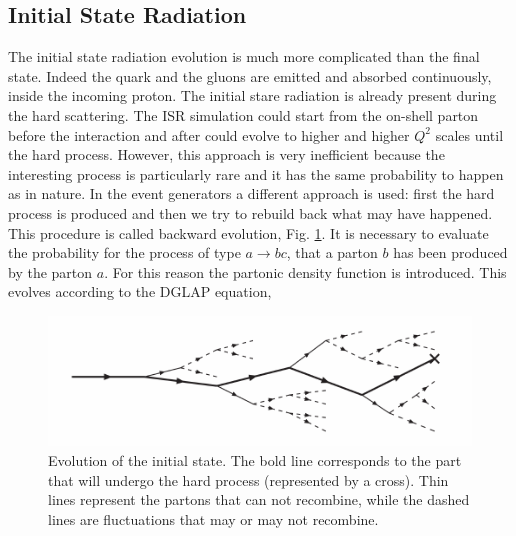 \subsection*{Initial State Radiation}
The initial state radiation evolution is much more complicated than the final state. 
Indeed the quark and the gluons are   emitted  and absorbed continuously, inside the incoming proton. The initial stare radiation is already present during the hard scattering.
The ISR simulation could start from the on-shell parton before the interaction and after  could evolve to higher and higher $ Q ^ 2 $ scales until the hard process.
However, this approach is very inefficient because the  interesting  process  is particularly rare and  it has the same probability to happen as in nature. 
In the event generators a different approach is  used: first the hard process is produced and then  we try to rebuild back what may have happened. 
This procedure is called backward evolution, Fig. \ref{isr}.
It is necessary to evaluate the  probability for the process of type $ a \rightarrow bc $,  that a parton $ b $ has  been produced by the parton $ a $.
For this reason the  partonic density function is introduced.  This evolves according to the DGLAP \cite{Altarelli: 1977zs} equation,
\begin{figure}
\centering
\includegraphics[scale= 0.8]{../Cap3/Fig_MC/isr}
\caption{ Evolution of the initial state. The bold line corresponds to the part that will undergo the hard process (represented by a cross). Thin lines represent the partons that can not recombine, while the dashed lines are fluctuations that may or may not recombine.  }
\label{isr}
\end{figure}


